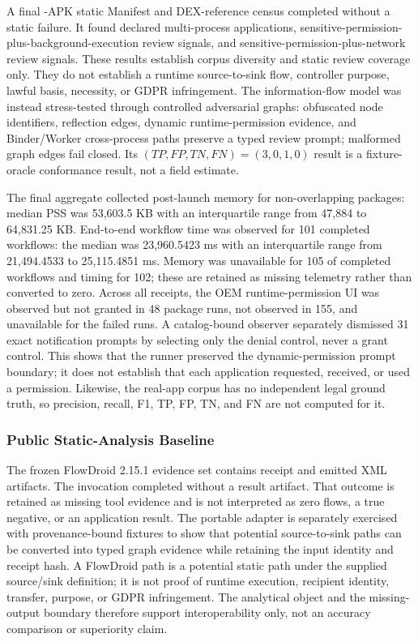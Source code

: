 A final \FDroidCensusN{}-APK static Manifest and DEX-reference census completed without a static failure. It found \FDroidMultiProcessN{} declared multi-process applications, \FDroidSensitiveBackgroundN{} sensitive-permission-plus-background-execution review signals, and \FDroidSensitiveNetworkN{} sensitive-permission-plus-network review signals. These results establish corpus diversity and static review coverage only. They do not establish a runtime source-to-sink flow, controller purpose, lawful basis, necessity, or GDPR infringement. The information-flow model was instead stress-tested through controlled adversarial graphs: obfuscated node identifiers, reflection edges, dynamic runtime-permission evidence, and Binder/Worker cross-process paths preserve a typed review prompt; malformed graph edges fail closed. Its $(TP,FP,TN,FN)=(3,0,1,0)$ result is a fixture-oracle conformance result, not a field estimate.

The final aggregate collected post-launch memory for \PssObservedN{} non-overlapping packages: median PSS was 53,603.5 KB with an interquartile range from 47,884 to 64,831.25 KB. End-to-end workflow time was observed for 101 completed workflows: the median was 23,960.5423 ms with an interquartile range from 21,494.4533 to 25,115.4851 ms. Memory was unavailable for 105 of \CompletedWorkflowsN{} completed workflows and timing for 102; these are retained as missing telemetry rather than converted to zero. Across all receipts, the OEM runtime-permission UI was observed but not granted in 48 package runs, not observed in 155, and unavailable for the \FailedDeviceWorkflowsN{} failed runs. A catalog-bound observer separately dismissed 31 exact notification prompts by selecting only the denial control, never a grant control. This shows that the runner preserved the dynamic-permission prompt boundary; it does not establish that each application requested, received, or used a permission. Likewise, the real-app corpus has no independent legal ground truth, so precision, recall, F1, TP, FP, TN, and FN are not computed for it.

\subsubsection{Public Static-Analysis Baseline}

The frozen FlowDroid 2.15.1 evidence set contains \FlowDroidReceiptsN{} receipt and \FlowDroidXmlArtifactsN{} emitted XML artifacts. The invocation completed without a result artifact. That outcome is retained as missing tool evidence and is not interpreted as zero flows, a true negative, or an application result. The portable adapter is separately exercised with provenance-bound fixtures to show that potential source-to-sink paths can be converted into typed graph evidence while retaining the input identity and receipt hash. A FlowDroid path is a potential static path under the supplied source/sink definition; it is not proof of runtime execution, recipient identity, transfer, purpose, or GDPR infringement. The analytical object and the missing-output boundary therefore support interoperability only, not an accuracy comparison or superiority claim.

